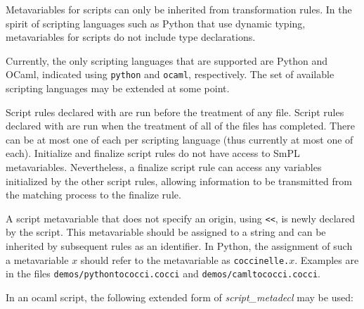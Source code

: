 Metavariables for scripts can only be inherited from transformation rules.
In the spirit of scripting languages such as Python that use dynamic
typing, metavariables for scripts do not include type declarations.

\begin{grammar}

    

\end{grammar}

Currently, the only scripting languages that are supported are Python and
OCaml, indicated using {\tt python} and {\tt ocaml}, respectively.  The
set of available scripting languages may be extended at some point.

Script rules declared with  are run before the treatment of
any file.  Script rules declared with  are run when the
treatment of all of the files has completed.  There can be at most one of
each per scripting language (thus currently at most one of each).
Initialize and finalize script rules do not have access to SmPL
metavariables.  Nevertheless, a finalize script rule can access any
variables initialized by the other script rules, allowing information to be
transmitted from the matching process to the finalize rule.

A script metavariable that does not specify an origin, using \texttt{<<},
is newly declared by the script.  This metavariable should be assigned to a
string and can be inherited by subsequent rules as an identifier.  In
Python, the assignment of such a metavariable $x$ should refer to the
metavariable as {\tt coccinelle.\(x\)}.  Examples are in the files
\texttt{demos/pythontococci.cocci} and \texttt{demos/camltococci.cocci}.

In an ocaml script, the following extended form of \textit{script\_metadecl}
may be used:

\begin{grammar}
\end{grammar}


